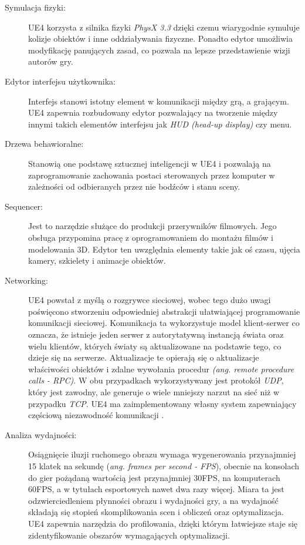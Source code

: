 \documentclass[multip]{SGGW-thesis}
\begin{document}
\begin{description}
\item[Symulacja fizyki:]UE4 korzysta z silnika fizyki {\em PhysX 3.3} dzięki czemu wiarygodnie symuluje kolizje obiektów i inne oddziaływania fizyczne. Ponadto edytor umożliwia modyfikację panujących zasad, co pozwala na lepsze przedstawienie wizji autorów gry.
\item[Edytor interfejsu użytkownika:] Interfejs stanowi istotny element w komunikacji między grą, a grającym. UE4 zapewnia rozbudowany edytor pozwalający na tworzenie między innymi takich elementów interfejsu jak {\em HUD (head-up display)} czy menu.
\item[Drzewa behawioralne:]Stanowią one podstawę sztucznej inteligencji w UE4 i pozwalają na zaprogramowanie zachowania postaci sterowanych przez komputer w zależności od odbieranych przez nie bodźców i stanu sceny.
\clearpage \item[Sequencer:]Jest to narzędzie służące do produkcji przerywników filmowych. Jego obsługa przypomina pracę z oprogramowaniem do montażu filmów i modelowania 3D. Edytor ten uwzględnia elementy takie jak oś czasu, ujęcia kamery, szkielety i animacje obiektów.
\item[Networking:]UE4 powstał z myślą o rozgrywce sieciowej, wobec tego dużo uwagi poświęcono stworzeniu odpowiedniej abstrakcji ułatwiającej programowanie komunikacji sieciowej. Komunikacja ta wykorzystuje model klient-serwer co oznacza, że istnieje jeden serwer z autorytatywną instancją świata oraz wielu klientów, których światy są aktualizowane na podstawie tego, co dzieje się na serwerze. Aktualizacje te opierają się o aktualizacje właściwości obiektów i zdalne wywołania procedur {\em (ang. remote procedure calls - RPC)}. W obu przypadkach wykorzystywany jest protokół {\em UDP}, który jest zawodny, ale generuje o wiele mniejszy narzut na sieć niż w przypadku {\em TCP}. UE4 ma zaimplementowany własny system zapewniający częściową niezawodność komunikacji \cite{unreal-wiki-replication}.
\item[Analiza wydajności:]Osiągnięcie iluzji ruchomego obrazu wymaga wygenerowania przynajmniej 15 klatek na sekundę ({\em ang. frames per second - FPS}), obecnie na konsolach do gier pożądaną wartością jest przynajmniej 30FPS, na komputerach 60FPS\cite{docs-profiler}, a w tytułach esportowych nawet dwa razy więcej. Miara ta jest odzwierciedleniem płynności obrazu i wydajności gry, a na wydajność składają się stopień skomplikowania scen i obliczeń oraz optymalizacja. UE4 zapewnia narzędzia do profilowania, dzięki którym łatwiejsze staje się zidentyfikowanie obszarów wymagających optymalizacji.

\end{description}
\end{document}
